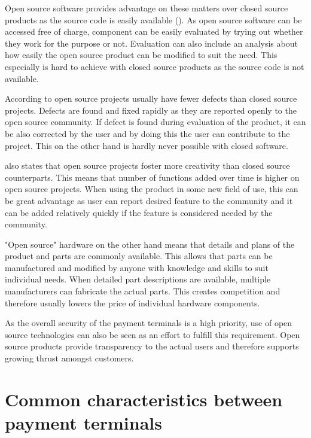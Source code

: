 Open source software provides advantage on these matters over closed source products as the source code is easily available (\emph{\cite{morgan2007benefits}}). As open source software can be accessed free of charge, component can be easily evaluated by trying out whether they work for the purpose or not. Evaluation can also include an analysis about how easily the open source product can be modified to suit the need. This especially is hard to achieve with closed source products as the source code is not available.

According to \emph{\cite{paulson2004empirical}} open source projects usually have fewer defects than closed source projects. Defects are found and fixed rapidly as they are reported openly to the open source community. If defect is found during evaluation of the product, it can be also corrected by the user and by doing this the user can contribute to the project. This on the other hand is hardly never possible with closed software.

\emph{\cite{paulson2004empirical}} also states that open source projects foster more creativity than closed source counterparts. This means that number of functions added over time is higher on open source projects. When using the product in some new field of use, this can be great advantage as user can report desired feature to the community and it can be added relatively quickly if the feature is considered needed by the community.

"Open source" hardware on the other hand means that details and plans of the product and parts are commonly available. This allows that parts can be manufactured and modified by anyone with knowledge and skills to suit individual needs. When detailed part descriptions are available, multiple manufacturers can fabricate the actual parts. This creates competition and therefore usually lowers the price of individual hardware components.

As the overall security of the payment terminals is a high priority, use of open source technologies can also be seen as an effort to fulfill this requirement. Open source products provide transparency to the actual users and therefore supports growing thrust amongst customers.

\section{Common characteristics between payment terminals}
\label{section:payment terminals}

